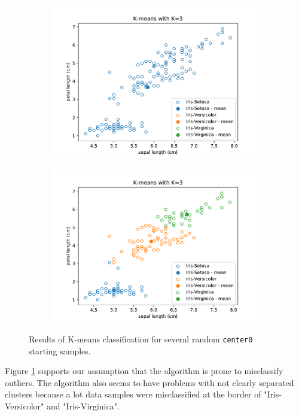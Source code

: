 \documentclass{article}
\begin{document}
\begin{figure}[!ht]
{\begin{subfigure}{0.6\textwidth}
	\includegraphics[width=\textwidth]{./Figures/2_1_Kmeans_randinit2}
	\end{subfigure}
	\begin{subfigure}{0.6\textwidth}
	\includegraphics[width=\textwidth]{./Figures/2_1_Kmeans_randinit3}
	\end{subfigure}
	}	
	\caption{Results of K-means classification for several random \texttt{center0} starting samples.}
	\label{2_1_Kmeans_randinit}
\end{figure}

Figure \ref{2_1_Kmeans_randinit} supports our assumption that the algorithm is prone to misclassify outliers. The algorithm also seems to have problems with not clearly separated clusters because a lot data samples were misclassified at the border of "Iris-Versicolor" and "Iris-Virginica".
\end{document}

